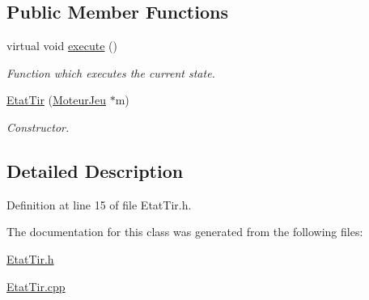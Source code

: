 \subsection*{Public Member Functions}
\begin{DoxyCompactItemize}
\item 
\hypertarget{class_etat_tir_a5967f8c1c1f37be216eb8c45215b386d}{
virtual void \hyperlink{class_etat_tir_a5967f8c1c1f37be216eb8c45215b386d}{execute} ()}
\label{class_etat_tir_a5967f8c1c1f37be216eb8c45215b386d}

\begin{DoxyCompactList}\small\item\em Function which executes the current state. \item\end{DoxyCompactList}\item 
\hypertarget{class_etat_tir_a4e1d899b409f6978bd47028ef38cb867}{
\hyperlink{class_etat_tir_a4e1d899b409f6978bd47028ef38cb867}{EtatTir} (\hyperlink{class_moteur_jeu}{MoteurJeu} $\ast$m)}
\label{class_etat_tir_a4e1d899b409f6978bd47028ef38cb867}

\begin{DoxyCompactList}\small\item\em Constructor. \item\end{DoxyCompactList}\end{DoxyCompactItemize}


\subsection{Detailed Description}


Definition at line 15 of file EtatTir.h.



The documentation for this class was generated from the following files:\begin{DoxyCompactItemize}
\item 
\hyperlink{_etat_tir_8h}{EtatTir.h}\item 
\hyperlink{_etat_tir_8cpp}{EtatTir.cpp}\end{DoxyCompactItemize}
